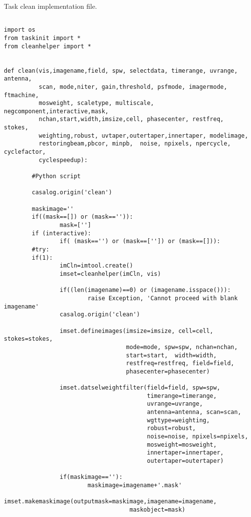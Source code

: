 Task clean implementation file.
\begin{verbatim}

import os
from taskinit import *
from cleanhelper import *


def clean(vis,imagename,field, spw, selectdata, timerange, uvrange, antenna, 
          scan, mode,niter, gain,threshold, psfmode, imagermode, ftmachine,
          mosweight, scaletype, multiscale, negcomponent,interactive,mask,
          nchan,start,width,imsize,cell, phasecenter, restfreq, stokes,
          weighting,robust, uvtaper,outertaper,innertaper, modelimage,
          restoringbeam,pbcor, minpb,  noise, npixels, npercycle, cyclefactor,
          cyclespeedup):

        #Python script

        casalog.origin('clean')

        maskimage=''
        if((mask==[]) or (mask=='')):
                mask=['']
        if (interactive):
                if( (mask=='') or (mask==['']) or (mask==[])):
        #try:
        if(1):
                imCln=imtool.create()
                imset=cleanhelper(imCln, vis)
                
                if((len(imagename)==0) or (imagename.isspace())):
                        raise Exception, 'Cannot proceed with blank imagename'
                casalog.origin('clean')
                
                imset.defineimages(imsize=imsize, cell=cell, stokes=stokes,
                                   mode=mode, spw=spw, nchan=nchan,
                                   start=start,  width=width,
                                   restfreq=restfreq, field=field,
                                   phasecenter=phasecenter)
                
                imset.datselweightfilter(field=field, spw=spw,
                                         timerange=timerange,
                                         uvrange=uvrange,
                                         antenna=antenna, scan=scan,
                                         wgttype=weighting,
                                         robust=robust,
                                         noise=noise, npixels=npixels,
                                         mosweight=mosweight,
                                         innertaper=innertaper,
                                         outertaper=outertaper)
                                         
                if(maskimage==''):
                        maskimage=imagename+'.mask'
                imset.makemaskimage(outputmask=maskimage,imagename=imagename,
                                    maskobject=mask)



\end{verbatim}
